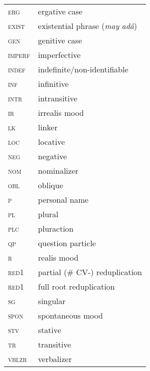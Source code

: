 \documentclass[output=paper]{langscibook}
\begin{document}
\begin{tabularx}{.45\textwidth}{lQ}
\textsc{erg} & ergative case\\

\textsc{exist} & existential phrase (\textit{may} \textit{adâ})\\

\textsc{gen} & genitive case\\

\textsc{imperf} & imperfective\\

\textsc{indef} & indefinite/non-identifiable\\

\textsc{inf} & infinitive\\

\textsc{intr} & intransitive\\

\textsc{ir} & irrealis mood\\

\textsc{lk} & linker\\

\textsc{loc} & locative\\

\textsc{neg} & negative\\

\textsc{nom} & nominalizer\\

\textsc{obl} & oblique\\

\textsc{p} & personal name\\

\textsc{pl} & plural\\

\textsc{plc} & pluraction\\

\textsc{qp} & question particle\\

\textsc{r} & realis mood\\

\textsc{red1} & partial (\# CV-) reduplication\\

\textsc{red1~} & full root reduplication\\

\textsc{sg} & singular\\

\textsc{spon} & spontaneous mood\\

\textsc{stv} & stative\\
\textsc{tr} & transitive\\
\textsc{vblzr} & verbalizer\\

\end{tabularx}



{\sloppy\printbibliography[heading=subbibliography,notkeyword=this]}
\end{document}
